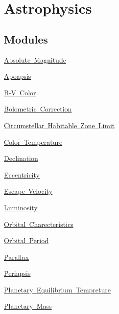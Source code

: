 \hypertarget{group___e_g_x_phys-_astrophysics}{}\section{Astrophysics}
\label{group___e_g_x_phys-_astrophysics}
\subsection*{Modules}
\begin{DoxyCompactItemize}
\item 
\mbox{\hyperlink{group___e_g_x_phys-_astrophysics-_absolute_magnitude}{Absolute Magnitude}}
\item 
\mbox{\hyperlink{group___e_g_x_phys-_apoapsis}{Apoapsis}}
\item 
\mbox{\hyperlink{group___e_g_x_phys-_astrophysic-_b-_v_color}{B-\/\+V Color}}
\item 
\mbox{\hyperlink{group___e_g_x_phys-_astrophysic-_bolometric_correction}{Bolometric Correction}}
\item 
\mbox{\hyperlink{group___e_g_x_phys-_circumstellar_habitable_zone_limit}{Circumstellar Habitable Zone Limit}}
\item 
\mbox{\hyperlink{group___e_g_x_phys-_astrophysics-_color_temperature}{Color Temperature}}
\item 
\mbox{\hyperlink{group___e_g_x_phys-_astrophysics-_declination}{Declination}}
\item 
\mbox{\hyperlink{group___e_g_x_phys-_eccentricity}{Eccentricity}}
\item 
\mbox{\hyperlink{group___e_g_x_phys-_astrophysics-_escape_velocity}{Escape Velocity}}
\item 
\mbox{\hyperlink{group___e_g_x_phys-_luminosity}{Luminosity}}
\item 
\mbox{\hyperlink{group___e_g_x_phys-_orbital_charecteristics}{Orbital Charecteristics}}
\item 
\mbox{\hyperlink{group___e_g_x_phys-_astrophysic-_orbital_period}{Orbital Period}}
\item 
\mbox{\hyperlink{group___e_g_x_phys-_astrophysic-_parallax}{Parallax}}
\item 
\mbox{\hyperlink{group___e_g_x_phys-_periapsis}{Periapsis}}
\item 
\mbox{\hyperlink{group___e_g_x_phys-_astrophysics-_planetary_equilibrium_tempreture}{Planetary Equilibrium Tempreture}}
\item 
\mbox{\hyperlink{group___e_g_x_phys-_planetary_mass}{Planetary Mass}}

\end{DoxyCompactItemize}
